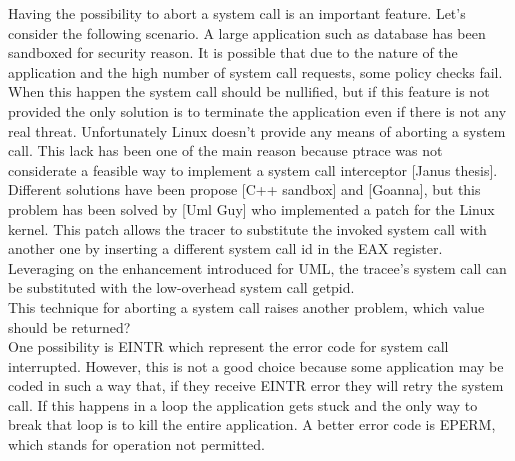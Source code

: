 Having the possibility to abort a system call is an important feature. Let’s consider the following scenario. A large application such as database has been sandboxed for security reason. It is possible that due to the nature of the application and the high number of system call requests, some policy checks fail. When this happen the system call should be nullified, but if this feature is not provided the only solution is to terminate the application even if there is not any real threat.
Unfortunately Linux doesn't provide any means of aborting a system call.  This lack has been one of the main reason because ptrace was not considerate a feasible way to implement a system call interceptor [Janus thesis]. 
Different solutions have been propose [C++ sandbox] and [Goanna], but this problem has been solved by [Uml Guy] who implemented a patch for the Linux kernel. This patch allows the tracer to substitute the invoked system call with another one by inserting a different system call id in the EAX register. Leveraging on the enhancement introduced for UML, the tracee’s system call can be substituted with the low-overhead system call getpid.\\
This technique for aborting a system call raises another problem, which value should be returned? \\
One possibility is EINTR which represent the error code for system call interrupted. However, this is not a good choice because some application may be coded in such a way that, if they receive EINTR error they will retry the system call. If this happens in a loop the application gets stuck and the only way to break that loop is to kill the entire application. A better error code is EPERM, which stands for operation not permitted.\\